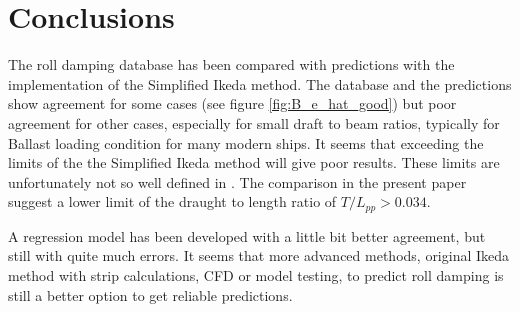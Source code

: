 \section{Conclusions}
\label{se:conclusions}

The roll damping database has been compared with predictions with the implementation of the Simplified Ikeda method. The database and the predictions show agreement for some cases (see figure \ref{fig:B_e_hat_good}) but poor agreement for other cases, especially for small draft to beam ratios, typically for Ballast loading condition for many modern ships. It seems that exceeding the limits of the the Simplified Ikeda method will give poor results. These limits are unfortunately not so well defined in \cite{kawahara_simple_2011}. The comparison in the present paper suggest a lower limit of the draught to length ratio of $T/L_{pp}>0.034$.



A regression model has been developed with a little bit better agreement, but still with quite much errors. It seems that more advanced methods, original Ikeda method with strip calculations, CFD or model testing, to predict roll damping is still a better option to get reliable predictions.  

